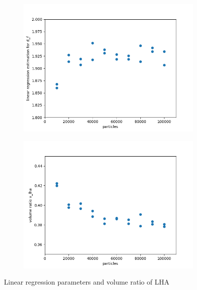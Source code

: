 \documentclass[12pt,a4paper]{scrartcl}
\newcommand{\1}{\mathbbm{1}}
\theoremstyle{definition}
\numberwithin{equation}{section}
\begin{document}
\begin{figure}[h]
	\centering
	\begin{subfigure}[b]{.45\textwidth}
		\includegraphics[width=1\linewidth]{images/lhaplot.png}
	\end{subfigure}
	\begin{subfigure}[b]{.45\textwidth}
		\includegraphics[width=1\linewidth]{images/volumeplot.png}
	\end{subfigure}
 \caption{Linear regression parameters and volume ratio of LHA}
 \label{plot}
\end{figure}
\end{document}

